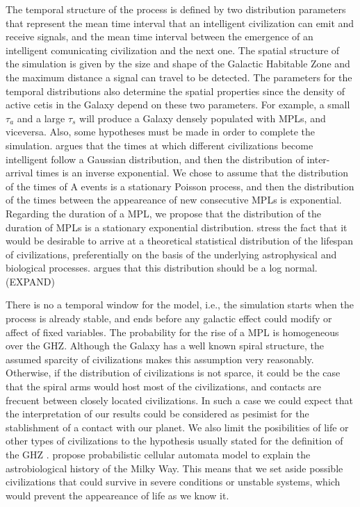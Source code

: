 The temporal structure of the process is defined by two distribution
parameters that represent the mean time interval that an intelligent
civilization can emit and receive signals, and the mean time interval
between the emergence of an intelligent comunicating civilization and
the next one.
%
The spatial structure of the simulation is given by the size and shape
of the Galactic Habitable Zone and the maximum distance a signal can
travel to be detected.
%
The parameters for the temporal distributions also determine the
spatial properties since the density of active cetis in the Galaxy
depend on these two parameters.
%
For example, a small $\tau_a$ and a large $\tau_s$ will produce a
Galaxy densely populated with MPLs, and viceversa.
%
Also, some hypotheses must be made in order to complete the
simulation.
%
\citet{forgan_spatiotemporal_2011} argues that the times at which
different civilizations become intelligent follow a Gaussian
distribution, and then the distribution of inter-arrival times is an
inverse exponential.
%
We chose to assume that the distribution of the times of A events is a
stationary Poisson process, and then the distribution of the times
between the appeareance of new consecutive MPLs is exponential.
%
Regarding the duration of a MPL, we propose that the distribution of
the duration of MPLs is a stationary exponential distribution.
%
\citet{balbi_impact_2018} stress the fact that it would be desirable
to arrive at a theoretical statistical distribution of the lifespan of
civilizations, preferentially on the basis of the underlying
astrophysical and biological processes.
%
\citet{maccone_lognormals_2014} argues that this distribution should
be a log normal.  (EXPAND)



There is no a temporal window for the model, i.e., the simulation
starts when the process is already stable, and ends before any
galactic effect could modify or affect of fixed variables.
%
The probability for the rise of a MPL is homogeneous over the GHZ.
%
Although the Galaxy has a well known spiral structure, the assumed
sparcity of civilizations makes this assumption very reasonably.
%
Otherwise, if the distribution of civilizations is not sparce, it
could be the case that the spiral arms would host most of the
civilizations, and contacts are frecuent between closely located
civilizations.
%
In such a case we could expect that the interpretation of our results
could be considered as pesimist for the stablishment of a contact with
our planet.
%
We also limit the posibilities of life or other types of civilizations
to the hypothesis usually stated for the definition of the GHZ
\citep{dayal_habitability_2016, gonzalez_galactic_2001,
lineweaver_galactic_2004, gonzalez_habitable_2005,
morrison_extending_2015, haqq-misra_evolution_2019,
rahvar_cosmic_2016, gobat_evolution_2016, rahvar_cosmic_2016}.
%
\citet{vukotic_astrobiological_2012} propose probabilistic cellular
automata model to explain the astrobiological history of the Milky
Way.
%
This means that we set aside possible civilizations that could survive
in severe conditions or unstable systems, which would prevent the
appeareance of life as we know it.

